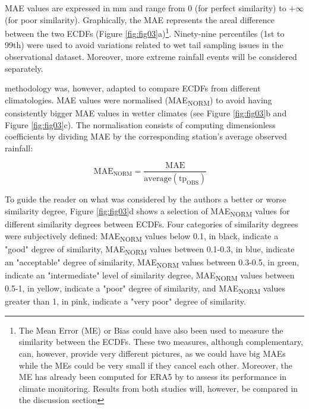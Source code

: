 \documentclass{ametsocV6.1}
\begin{document}
MAE values are expressed in mm and range from 0 (for perfect similarity) to $+\infty$ (for poor similarity). Graphically, the MAE represents the areal difference between the two ECDFs (Figure \ref{fig:fig03}a)\footnote{The Mean Error (ME) or Bias could have also been used to measure the similarity between the ECDFs. These two measures, although complementary, can, however, provide very different pictures, as we could have big MAEs while the MEs could be very small if they cancel each other. Moreover, the ME has already been computed for ERA5 by \cite{Lavers2022} to assess its performance in climate monitoring. Results from both studies will, however, be compared in the discussion section}. Ninety-nine percentiles (1st to 99th) were used to avoid variations related to wet tail sampling issues in the observational dataset. Moreover, more extreme rainfall events will be considered separately.

\cite{Gudmundsson2012} methodology was, however, adapted to compare ECDFs from different climatologies. MAE values were normalised (MAE\textsubscript{NORM}) to avoid having consistently bigger MAE values in wetter climates (see Figure \ref{fig:fig03}b and Figure \ref{fig:fig03}c). The normalisation consists of computing dimensionless coefficients by dividing MAE by the corresponding station's average observed rainfall:

\begin{equation}
\text{MAE}_{\text{NORM}} = \frac{\text{MAE}}{\text{average}(\text{tp}_{\text{OBS}})} \quad
\end{equation}

To guide the reader on what was considered by the authors a better or worse similarity degree, Figure \ref{fig:fig03}d shows a selection of MAE\textsubscript{NORM} values for different similarity degrees between ECDFs. Four categories of similarity degrees were subjectively defined: MAE\textsubscript{NORM} values below 0.1, in black, indicate a "good" degree of similarity, MAE\textsubscript{NORM} values between 0.1-0.3, in blue, indicate an "acceptable" degree of similarity, MAE\textsubscript{NORM} values between 0.3-0.5, in green, indicate an "intermediate" level of similarity degree, MAE\textsubscript{NORM} values between 0.5-1, in yellow, indicate a "poor" degree of similarity, and MAE\textsubscript{NORM} values greater than 1, in pink, indicate a "very poor" degree of similarity. 
\end{document}
